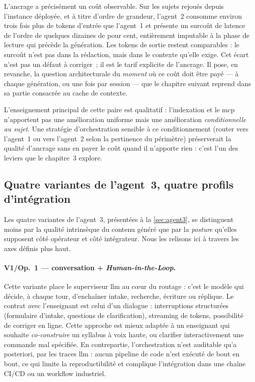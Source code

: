 L'ancrage a précisément un coût observable. Sur les sujets rejoués
depuis l'instance déployée, et à titre d'ordre de grandeur,
l'agent~2 consomme environ trois fois plus de
tokens d'entrée que l'agent~1 et présente un surcoût de latence de
l'ordre de quelques dizaines de pour cent, entièrement imputable à
la phase de lecture qui précède la génération. Les tokens de sortie
restent comparables : le surcoût n'est pas dans la rédaction, mais
dans le contexte qu'elle exige. Cet écart n'est pas un défaut à
corriger~; il est le tarif explicite de l'ancrage. Il pose, en
revanche, la question architecturale du \emph{moment} où ce coût
doit être payé — à chaque génération, ou une fois par session — que
le chapitre suivant reprend dans sa partie consacrée au cache de
contexte.

L'enseignement principal de cette paire est qualitatif :
l'indexation et le \gls{mcp} n'apportent pas une amélioration
uniforme mais une amélioration \emph{conditionnelle au sujet}. Une
stratégie d'orchestration sensible à ce conditionnement (router vers
l'agent~1 ou vers l'agent~2 selon la pertinence du périmètre)
préserverait la qualité d'ancrage sans en payer le coût quand il
n'apporte rien : c'est l'un des leviers que le chapitre~3 explore.

\subsection{Quatre variantes de l'agent~3, quatre profils d'intégration}
\label{sec:4variantes}

Les quatre variantes de l'agent~3, présentées à la
\textsection\ref{sec:agent3}, se distinguent moins par la qualité
intrinsèque du contenu généré que par la \emph{posture} qu'elles
supposent côté opérateur et côté intégrateur. Nous les relisons ici
à travers les axes définis plus haut.

\paragraph{V1/Op.~1 — conversation + \emph{Human-in-the-Loop}.}
Cette variante place le superviseur \gls{llm} au cœur du routage :
c'est le modèle qui décide, à chaque tour, d'enchaîner intake,
recherche, écriture ou réplique. Le contrat avec l'enseignant est
celui d'un dialogue : interruptions structurées (formulaire d'intake,
questions de clarification), streaming de tokens, possibilité de
corriger en ligne. Cette approche est mieux adaptée à un enseignant
qui souhaite \emph{co-construire} un syllabus à voix haute, ou
clarifier interactivement une commande mal spécifiée. En contrepartie,
l'orchestration n'est auditable qu'a posteriori, par les traces
\gls{llm} : aucun pipeline de code n'est exécuté de bout en bout, ce
qui limite la reproductibilité et complique l'intégration dans une
chaîne CI/CD ou un workflow industriel.

